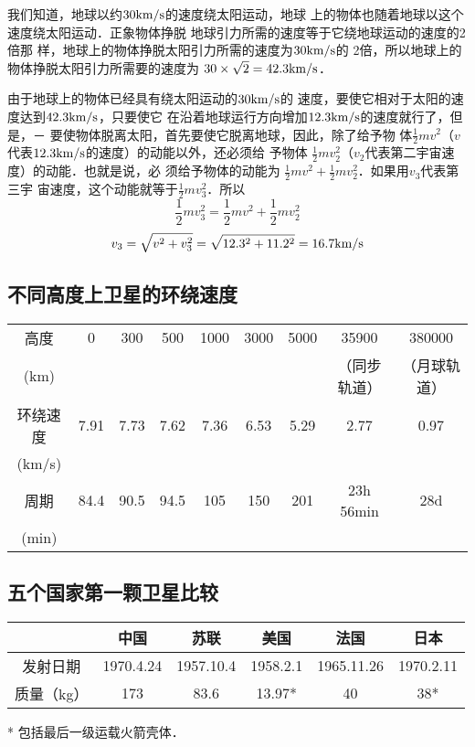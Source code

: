 我们知道，地球以约$30{\rm km/s}$的速度绕太阳运动，地球
上的物体也随着地球以这个速度绕太阳运动．正象物体挣脱
地球引力所需的速度等于它绕地球运动的速度的2倍那
样，地球上的物体挣脱太阳引力所需的速度为$30{\rm km/s}$的
2倍，所以地球上的物体挣脱太阳引力所需要的速度为
$30\times\sqrt{2}=42.3{\rm km/s}$．

由于地球上的物体已经具有绕太阳运动的$30{\rm km/s}$的
速度，要使它相对于太阳的速度达到$42.3{\rm km/s}$，只要使它
在沿着地球运行方向增加$12.3{\rm km/s}$的速度就行了，但是，－
要使物体脱离太阳，首先要使它脱离地球，因此，除了给予物
体$\frac{1}{2}mv^2$（$v$代表$12.3{\rm km/s}$的速度）的动能以外，还必须给
予物体
$\frac{1}{2}mv^2_2$（$v_2$代表第二宇宙速度）的动能．也就是说，必
须给予物体的动能为
$\frac{1}{2}mv^2+\frac{1}{2}mv^2_2$．如果用$v_3$代表第三宇
宙速度，这个动能就等于$\frac{1}{2}mv^2_3$．所以
\[\frac{1}{2}mv^2_3=\frac{1}{2}mv^2+\frac{1}{2}mv^2_2\]
\[v_3=\sqrt{v^2+v^2_3}=\sqrt{12.3^2+11.2^2}=16.7{\rm km/s}\]

\subsection{不同高度上卫星的环绕速度}

\begin{center}
\begin{tabular}{ccccccccc}
\hline
高度& 0&300&500&1000&3000&5000&35900& 380000\\
(km) &&&&&&&（同步轨道）  &（月球轨道）\\
\hline
环绕速度 &7.91&7.73&7.62&7.36&6.53&5.29&2.77&0.97\\
(km/s)\\
周期&84.4&90.5&94.5&105&150&201&23h 56min&28d\\
(min)\\
\hline
\end{tabular}
\end{center}

\subsection{五个国家第一颗卫星比较}
\begin{center}
\begin{tabular}{cccccc}
\hline
&中国&苏联&美国&法国&日本\\
\hline
发射日期&1970.4.24&1957.10.4&1958.2.1&1965.11.26&1970.2.11\\
质量（kg）&173&83.6&13.97*&40&38*\\
\hline
\end{tabular}

* 包括最后一级运载火箭壳体．
\end{center}

